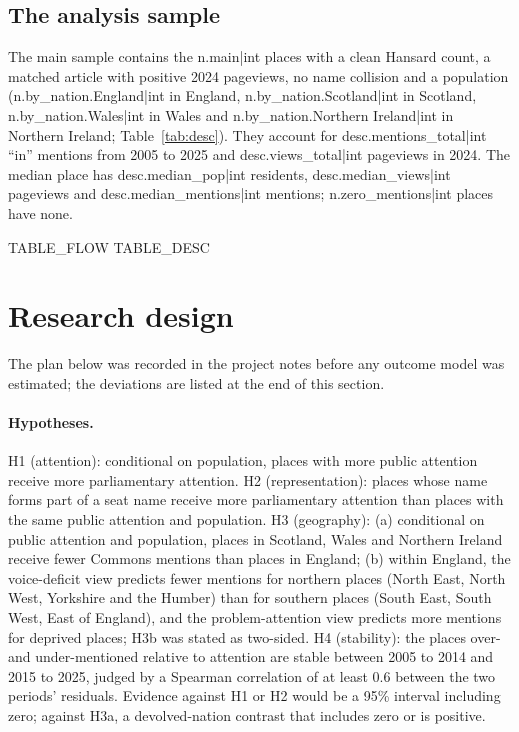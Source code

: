 \documentclass[11pt,a4paper]{article}
\begin{document}
\subsection{The analysis sample}
The main sample contains the {{n.main|int}} places with a clean Hansard count, a matched article with positive 2024 pageviews, no name collision and a population ({{n.by_nation.England|int}} in England, {{n.by_nation.Scotland|int}} in Scotland, {{n.by_nation.Wales|int}} in Wales and {{n.by_nation.Northern Ireland|int}} in Northern Ireland; Table~\ref{tab:desc}). They account for {{desc.mentions_total|int}} ``in'' mentions from 2005 to 2025 and {{desc.views_total|int}} pageviews in 2024. The median place has {{desc.median_pop|int}} residents, {{desc.median_views|int}} pageviews and {{desc.median_mentions|int}} mentions; {{n.zero_mentions|int}} places have none.

{{TABLE_FLOW}}
{{TABLE_DESC}}

\section{Research design}
\label{sec:design}
The plan below was recorded in the project notes before any outcome model was estimated; the deviations are listed at the end of this section.

\paragraph{Hypotheses.} H1 (attention): conditional on population, places with more public attention receive more parliamentary attention. H2 (representation): places whose name forms part of a seat name receive more parliamentary attention than places with the same public attention and population. H3 (geography): (a) conditional on public attention and population, places in Scotland, Wales and Northern Ireland receive fewer Commons mentions than places in England; (b) within England, the voice-deficit view predicts fewer mentions for northern places (North East, North West, Yorkshire and the Humber) than for southern places (South East, South West, East of England), and the problem-attention view predicts more mentions for deprived places; H3b was stated as two-sided. H4 (stability): the places over- and under-mentioned relative to attention are stable between 2005 to 2014 and 2015 to 2025, judged by a Spearman correlation of at least 0.6 between the two periods' residuals. Evidence against H1 or H2 would be a 95\% interval including zero; against H3a, a devolved-nation contrast that includes zero or is positive.
\end{document}
